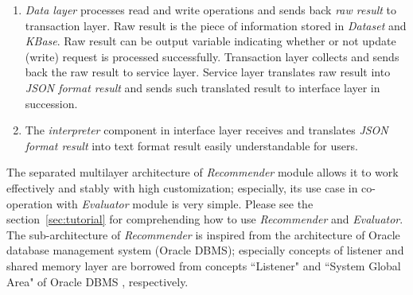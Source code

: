 \documentclass[a4paper]{llncs}
\begin{document}
\begin{enumerate}
\item \textit{Data layer} processes read and write operations and sends back \textit{raw result} to transaction layer. Raw result is the piece of information stored in \textit{Dataset} and \textit{KBase}. Raw result can be output variable indicating whether or not update (write) request is processed successfully. Transaction layer collects and sends back the raw result to service layer. Service layer translates raw result into \textit{JSON format result} and sends such translated result to interface layer in succession.
\item The \textit{interpreter} component in interface layer receives and translates \textit{JSON format result} into text format result easily understandable for users.
\end{enumerate}
The separated multilayer architecture of \textit{Recommender} module allows it to work effectively and stably with high customization; especially, its use case in co-operation with \textit{Evaluator} module is very simple. Please see the section~\ref{sec:tutorial} for comprehending how to use \textit{Recommender} and \textit{Evaluator}. The sub-architecture of \textit{Recommender} is inspired from the architecture of Oracle database management system (Oracle DBMS); especially concepts of listener and shared memory layer are borrowed from concepts ``Listener" and ``System Global Area" of Oracle DBMS \cite{oracle2017dbms}, respectively.
\end{document}
